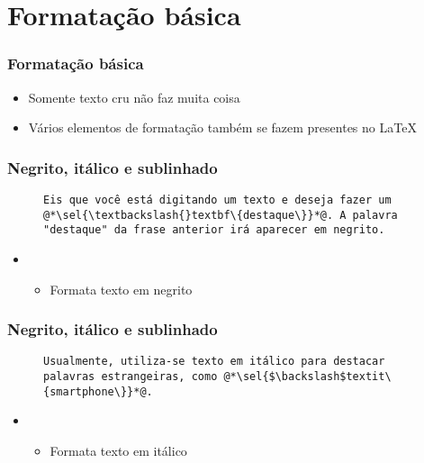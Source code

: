 \section{Formatação básica}

\begin{frame}[fragile] \frametitle{Formatação básica}
\begin{itemize}
	\item Somente texto cru não faz muita coisa
	\item Vários elementos de formatação também se fazem presentes no LaTeX
\end{itemize}
\end{frame}

\begin{frame}[fragile] \frametitle{Negrito, itálico e sublinhado}
\begin{figure}[!t]
\begin{lstlisting}
Eis que você está digitando um texto e deseja fazer um @*\sel{\textbackslash{}textbf\{destaque\}}*@. A palavra "destaque" da frase anterior irá aparecer em negrito.
\end{lstlisting}
\end{figure}

\begin{itemize}
	\item {}
	\begin{itemize}
		\item Formata texto em negrito
	\end{itemize}
\end{itemize}
\end{frame}

\begin{frame}[fragile] \frametitle{Negrito, itálico e sublinhado}
\begin{figure}[!t]
\begin{lstlisting}
Usualmente, utiliza-se texto em itálico para destacar palavras estrangeiras, como @*\sel{$\backslash$textit\{smartphone\}}*@.
\end{lstlisting}
\end{figure}

\begin{itemize}
	\item {}
	\begin{itemize}
		\item Formata texto em itálico
	\end{itemize}
\end{itemize}
\end{frame}

